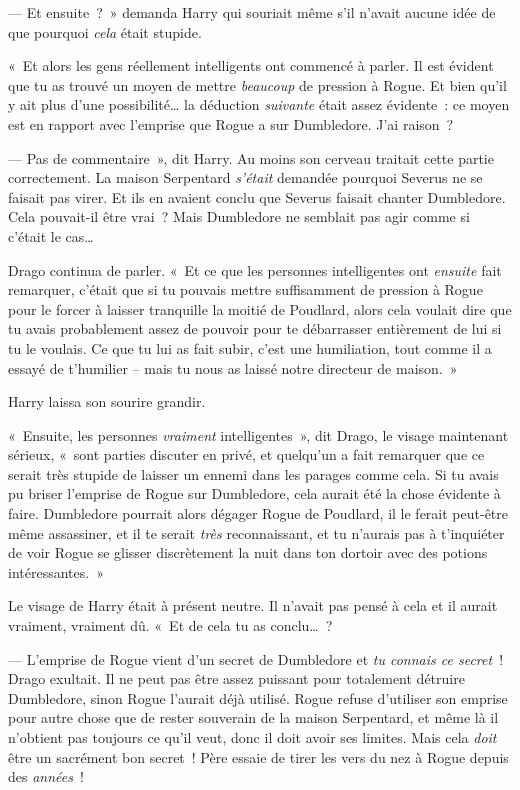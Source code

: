 --- Et ensuite~?~»
demanda Harry qui souriait même s'il n'avait aucune idée de que pourquoi \emph{cela} était stupide.

«~Et alors les gens réellement intelligents ont commencé à parler.
Il est évident que tu as trouvé un moyen de mettre \emph{beaucoup} de pression à Rogue.
Et bien qu'il y ait plus d'une possibilité… la déduction \emph{suivante} était assez évidente~: ce moyen est en rapport avec l'emprise que Rogue a sur Dumbledore.
J'ai raison~?

--- Pas de commentaire~», dit Harry.
Au moins son cerveau traitait cette partie correctement.
La maison Serpentard \emph{s'était} demandée pourquoi Severus ne se faisait pas virer.
Et ils en avaient conclu que Severus faisait chanter Dumbledore.
Cela pouvait-il être vrai~?
Mais Dumbledore ne semblait pas agir comme si c'était le cas…

Drago continua de parler.
«~Et ce que les personnes intelligentes ont \emph{ensuite} fait remarquer, c'était que si tu pouvais mettre suffisamment de pression à Rogue pour le forcer à laisser tranquille la moitié de Poudlard, alors cela voulait dire que tu avais probablement assez de pouvoir pour te débarrasser entièrement de lui si tu le voulais.
Ce que tu lui as fait subir, c'est une humiliation, tout comme il a essayé de t'humilier -- mais tu nous as laissé notre directeur de maison.~»

Harry laissa son sourire grandir.

«~Ensuite, les personnes \emph{vraiment} intelligentes~», dit Drago, le visage maintenant sérieux, «~sont parties discuter en privé, et quelqu'un a fait remarquer que ce serait très stupide de laisser un ennemi dans les parages comme cela.
Si tu avais pu briser l'emprise de Rogue sur Dumbledore, cela aurait été la chose évidente à faire.
Dumbledore pourrait alors dégager Rogue de Poudlard, il le ferait peut-être même assassiner, et il te serait \emph{très} reconnaissant, et tu n'aurais pas à t'inquiéter de voir Rogue se glisser discrètement la nuit dans ton dortoir avec des potions intéressantes.~»

Le visage de Harry était à présent neutre.
Il n'avait pas pensé à cela et il aurait vraiment, vraiment dû.
«~Et de cela tu as conclu…~?

--- L'emprise de Rogue vient d'un secret de Dumbledore et \emph{tu connais ce secret}~!
Drago exultait.
Il ne peut pas être assez puissant pour totalement détruire Dumbledore, sinon Rogue l'aurait déjà utilisé.
Rogue refuse d'utiliser son emprise pour autre chose que de rester souverain de la maison Serpentard, et même là il n'obtient pas toujours ce qu'il veut, donc il doit avoir ses limites.
Mais cela \emph{doit} être un sacrément bon secret~!
Père essaie de tirer les vers du nez à Rogue depuis des \emph{années}~!

